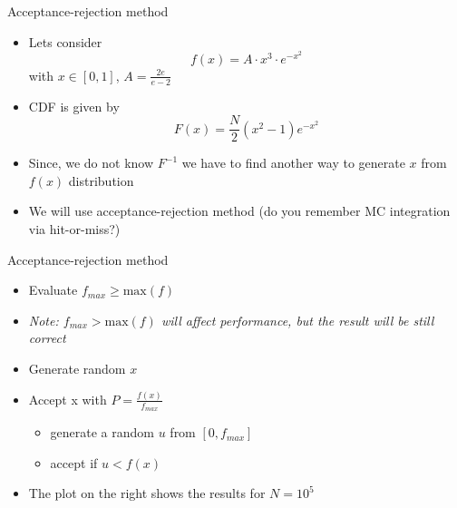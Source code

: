 \begin{slide}[toc=Acceptance-rejection]{Acceptance-rejection method}
\null\vfill

  \twocolumn
  {
    \begin{itemize}
      \item Lets consider
      $$f(x) = A \cdot x^3 \cdot e^{-x^2}$$
      with $x \in [0, 1]$, $A = \frac{2e}{e-2}$ 
      \item CDF is given by
      $$F(x) = \frac{N}{2}(x^2 - 1)e^{-x^2}$$
    \end{itemize}
  }
  {
    
  }
  
  \begin{itemize}
    \item Since, we do not know $F^{-1}$ we have to find another way to generate $x$ from $f(x)$ distribution
    \item We will use acceptance-rejection method (do you remember MC integration via hit-or-miss?)
  \end{itemize}

\vfill\null
\end{slide}

\begin{slide}[toc=]{Acceptance-rejection method}
\null\vfill

  \twocolumn
  {
    \begin{itemize}
      \item Evaluate $f_{max} \geq \mbox{max}(f)$
      \item[] {\it\color{pdcolor3}Note: $f_{max} > \mbox{max}(f)$ will affect performance, but the result will be still correct}
      \item Generate random $x$
      \item Accept x with $P = \frac{f(x)}{f_{max}}$
      \begin{itemize}
	\item generate a random $u$ from $[0, f_{max}]$
	\item accept if $u < f(x)$
      \end{itemize}
      \item The plot on the right shows the results for $N = 10^5$
    \end{itemize}
  }
  {
    
    
  }

\vfill\null
\end{slide}

